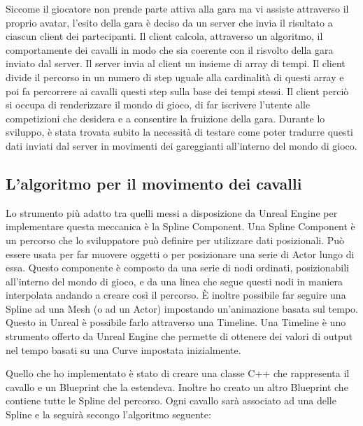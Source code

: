     Siccome il giocatore non prende parte attiva alla gara ma vi assiste attraverso il proprio avatar, l'esito della gara è deciso da un server che invia il risultato a ciascun client dei partecipanti.
    Il client calcola, attraverso un algoritmo, il comportamente dei cavalli in modo che sia coerente con il risvolto della gara inviato dal server.
    Il server invia al client un insieme di array di tempi.
    Il client divide il percorso in un numero di step uguale alla cardinalità di questi array e poi fa percorrere ai cavalli questi step sulla base dei tempi stessi.
    Il client perciò si occupa di renderizzare il mondo di gioco, di far iscrivere l'utente alle competizioni che desidera e a consentire la fruizione della gara.
    Durante lo sviluppo, è stata trovata subito la necessità di testare come poter tradurre questi dati inviati dal server in movimenti dei gareggianti all'interno del mondo di gioco.

    \subsection{L'algoritmo per il movimento dei cavalli}

        Lo strumento più adatto tra quelli messi a disposizione da Unreal Engine per implementare questa meccanica è la Spline Component.
        Una Spline Component è un percorso che lo sviluppatore può definire per utilizzare dati posizionali.
        Può essere usata per far muovere oggetti o per posizionare una serie di Actor lungo di essa.
        Questo componente è composto da una serie di nodi ordinati, posizionabili all'interno del mondo di gioco, e da una linea che segue questi nodi in maniera interpolata andando a creare così il percorso.
        È inoltre possibile far seguire una Spline ad una Mesh (o ad un Actor) impostando un'animazione basata sul tempo.
        Questo in Unreal è possibile farlo attraverso una Timeline.
        Una Timeline è uno strumento offerto da Unreal Engine che permette di ottenere dei valori di output nel tempo basati su una Curve impostata inizialmente.

        Quello che ho implementato è stato di creare una classe C++ che rappresenta il cavallo e un Blueprint che la estendeva.
        Inoltre ho creato un altro Blueprint che contiene tutte le Spline del percorso.
        Ogni cavallo sarà associato ad una delle Spline e la seguirà secongo l'algoritmo seguente:

